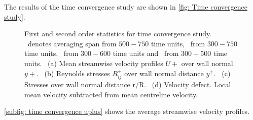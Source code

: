 The results of the time convergence study are shown in \autoref{fig: Time convergence study}.
\begin{figure}[h]
    \centering
    \begin{subfigure}[t]{0.495\textwidth}
        \centering
        \subcaption{}
        
        \label{subfig: time convergence uplus}
    \end{subfigure}
    \hfill
    \begin{subfigure}[t]{0.495\textwidth}
        \centering
        \subcaption{}
        
        \label{subfig: time convergence RS}
    \end{subfigure}
    \plotverticalspacing
    \begin{subfigure}[t]{0.495\textwidth}
        \centering
        \subcaption{}
        
        \label{subfig: time convergence total stress}
    \end{subfigure}
    \hfill
    \begin{subfigure}[t]{0.495\textwidth}
        \centering
        \subcaption{}
        
        \label{subfig: time convergence velocity defect}
    \end{subfigure}
    \plotverticalspacing
    \caption[First and second order statistics for time convergence study]{First and second order statistics for time convergence study. \tfifesevenSymbol \ denotes averaging span from $500-750$ time units, \tthreesevenSymbol \ from $300-750$ time units, \tthreesixSymbol \ from $300-600$ time units and \tthreefiveSymbol \ from $300-500$ time units.~
    (a) Mean streamwise velocity profiles $U+$ over wall normal $y+$.~
    (b) Reynolds stresses $R_{ij}^+$ over wall normal distance $y^+$.~
    (c) Stresses over wall normal distance r/R.~
    (d) Velocity defect. Local mean velocity subtracted from mean centreline velocity.}
    \label{fig: Time convergence study}
\end{figure}
\autoref{subfig: time convergence uplus} shows the average streamwise velocity profiles.
